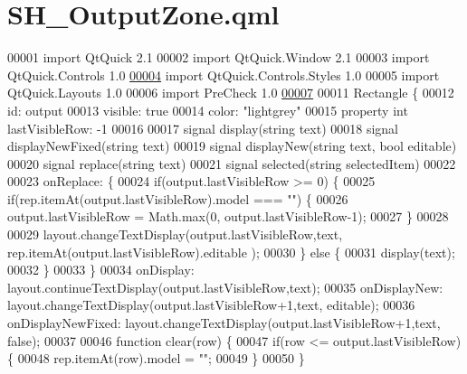 \hypertarget{SH__OutputZone_8qml}{\section{S\-H\-\_\-\-Output\-Zone.\-qml}
\label{SH__OutputZone_8qml}
}

\begin{DoxyCode}
00001 \textcolor{keyword}{import} QtQuick 2.1
00002 import QtQuick.Window 2.1
00003 import QtQuick.Controls 1.0
\hypertarget{SH__OutputZone_8qml_source_l00004}{}\hyperlink{classSH__OutputZone}{00004} import QtQuick.Controls.Styles 1.0
00005 import QtQuick.Layouts 1.0
00006 import PreCheck 1.0
\hypertarget{SH__OutputZone_8qml_source_l00007}{}\hyperlink{classSH__OutputZone_ae324bcdd20ad4a9e435678d045964dc9}{00007} 
00011 Rectangle \{
00012     \textcolor{keywordtype}{id}: output
00013     visible: \textcolor{keyword}{true}
00014     color: \textcolor{stringliteral}{"lightgrey"}
00015     \textcolor{keyword}{property} \textcolor{keywordtype}{int} lastVisibleRow: -1
00016 
00017     signal display(\textcolor{keywordtype}{string} text)
00018     signal displayNewFixed(\textcolor{keywordtype}{string} text)
00019     signal displayNew(\textcolor{keywordtype}{string} text, \textcolor{keywordtype}{bool} editable)
00020     signal replace(\textcolor{keywordtype}{string} text)
00021     signal selected(\textcolor{keywordtype}{string} selectedItem)
00022 
00023     onReplace: \{
00024         \textcolor{keywordflow}{if}(output.lastVisibleRow >= 0) \{
00025             \textcolor{keywordflow}{if}(rep.itemAt(output.lastVisibleRow).model === \textcolor{stringliteral}{""}) \{
00026                 output.lastVisibleRow = Math.max(0, output.lastVisibleRow-1);
00027             \}
00028 
00029             layout.changeTextDisplay(output.lastVisibleRow,text, rep.itemAt(output.lastVisibleRow).editable
      );
00030         \} \textcolor{keywordflow}{else} \{
00031             display(text);
00032         \}
00033     \}
00034     onDisplay: layout.continueTextDisplay(output.lastVisibleRow,text);
00035     onDisplayNew: layout.changeTextDisplay(output.lastVisibleRow+1,text, editable);
00036     onDisplayNewFixed: layout.changeTextDisplay(output.lastVisibleRow+1,text, \textcolor{keyword}{false});
00037 
00046     \textcolor{keyword}{function} clear(row) \{
00047         \textcolor{keywordflow}{if}(row <= output.lastVisibleRow) \{
00048             rep.itemAt(row).model = \textcolor{stringliteral}{""};
00049         \}
00050     \}

\end{DoxyCode}
